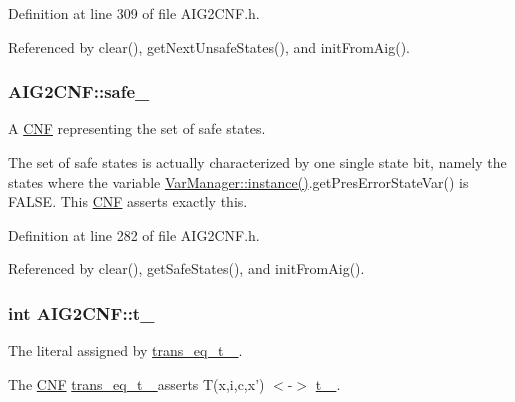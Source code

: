 Definition at line 309 of file A\-I\-G2\-C\-N\-F.\-h.



Referenced by clear(), get\-Next\-Unsafe\-States(), and init\-From\-Aig().

\hypertarget{classAIG2CNF_a394d2a3600bc3bec864cf08acac61437}{
\subsubsection[{safe\-\_\-}]{ A\-I\-G2\-C\-N\-F\-::safe\-\_\-\hspace{0.3cm}{\ttfamily [protected]}}}\label{classAIG2CNF_a394d2a3600bc3bec864cf08acac61437}


A \hyperlink{classCNF}{C\-N\-F} representing the set of safe states. 

The set of safe states is actually characterized by one single state bit, namely the states where the variable \hyperlink{classVarManager_ac1a84b367c26dfc5ee9e612f7d61b288}{Var\-Manager\-::instance()}.get\-Pres\-Error\-State\-Var() is F\-A\-L\-S\-E. This \hyperlink{classCNF}{C\-N\-F} asserts exactly this. 

Definition at line 282 of file A\-I\-G2\-C\-N\-F.\-h.



Referenced by clear(), get\-Safe\-States(), and init\-From\-Aig().

\hypertarget{classAIG2CNF_af2a7f6ecdcec3b5b2f37a11b0adde65a}{
\subsubsection[{t\-\_\-}]{\setlength{\rightskip}{0pt plus 5cm}int A\-I\-G2\-C\-N\-F\-::t\-\_\-\hspace{0.3cm}{\ttfamily [protected]}}}\label{classAIG2CNF_af2a7f6ecdcec3b5b2f37a11b0adde65a}


The literal assigned by \hyperlink{classAIG2CNF_af7e9b65092f626865a4aa541a48e4f1b}{trans\-\_\-eq\-\_\-t\-\_\- }. 

The \hyperlink{classCNF}{C\-N\-F} \hyperlink{classAIG2CNF_af7e9b65092f626865a4aa541a48e4f1b}{trans\-\_\-eq\-\_\-t\-\_\- } asserts T(x,i,c,x') $<$-\/$>$ \hyperlink{classAIG2CNF_af2a7f6ecdcec3b5b2f37a11b0adde65a}{t\-\_\- }. 

